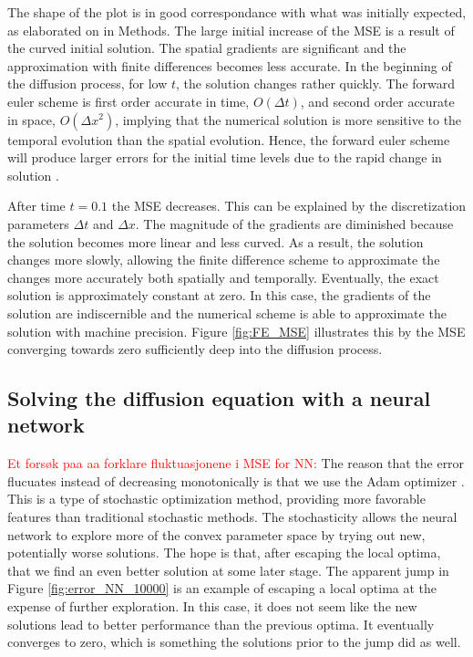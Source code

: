 \documentclass[12pt]{extarticle}
\begin{document}
\par The shape of the plot is in good correspondance with what was initially expected, as elaborated on in Methods. The large initial increase of the MSE is a result of the curved initial solution. The spatial gradients are significant and the approximation with finite differences becomes less accurate.
In the beginning of the diffusion process, for low $t$, the solution changes rather quickly. The forward euler scheme is first order accurate in time, $O(\Delta t)$, and second order accurate in space, $O(\Delta x^2)$, implying that the numerical solution is more sensitive to the temporal evolution than the spatial evolution. Hence, the forward euler scheme will produce larger errors for the initial time levels due to the rapid change in solution \cite{Linge2017}.
\par After time $t=0.1$ the MSE decreases. This can be explained by the discretization parameters $\Delta t$ and $\Delta x$. The magnitude of the gradients are diminished because the solution becomes more linear and less curved. As a result, the solution changes more slowly, allowing the finite difference scheme to approximate the changes more accurately both spatially and temporally. Eventually, the exact solution is approximately constant at zero. In this case, the gradients of the solution are indiscernible and the numerical scheme is able to approximate the solution with machine precision. Figure \ref{fig:FE_MSE} illustrates this by the MSE converging towards zero sufficiently deep into the diffusion process.

\subsection{Solving the diffusion equation with a neural network}

\par \textcolor{red}{Et forsøk paa aa forklare fluktuasjonene i MSE for NN:} The reason that the error flucuates instead of decreasing monotonically is that we use the Adam optimizer \cite{kingma2017adam}. This is a type of stochastic optimization method, providing more favorable features than traditional stochastic methods. The stochasticity allows the neural network to explore more of the convex parameter space by trying out new, potentially worse solutions. The hope is that, after escaping the local optima, that we find an even better solution at some later stage. The apparent jump in Figure \ref{fig:error_NN_10000} is an example of escaping a local optima at the expense of further exploration. In this case, it does not seem like the new solutions lead to better performance than the previous optima. It eventually converges to zero, which is something the solutions prior to the jump did as well. 
\end{document}
